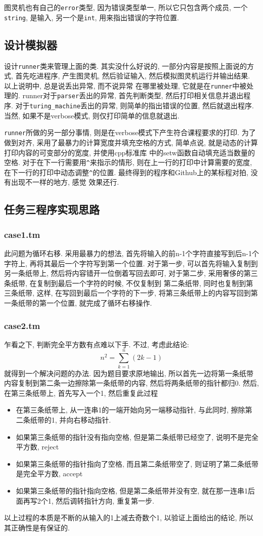 \documentclass[utf8]{article}
\begin{document}
图灵机也有自己的\verb|error|类型, 因为错误类型单一, 所以它只包含两个成员, 一个\verb|string|, 是输入, 另一个是\verb|int|, 用来指出错误的字符位置. 

\subsection[模拟器]{设计模拟器}
设计\verb|runner|类来管理上面的类. 其实没什么好说的,
 一部分内容是按照上面说的方式, 首先吃进程序, 产生图灵机, 然后验证输入, 然后模拟图灵机运行并输出结果. 以上说明中, 总是说丢出异常, 而不说异常
在哪里被处理, 它就是在\verb|runner|中被处理的. runner对于\verb|parser|丢出的异常, 首先判断类型, 然后打印相关信息并退出程序. 对于\verb|turing_machine|丢出的异常, 则简单的指出错误的位置, 
然后就退出程序. 当然, 如果不是verbose模式, 则仅打印简单的信息就退出. 

\verb|runner|所做的另一部分事情, 则是在verbose模式下产生符合课程要求的打印. 为了做到对齐, 采用了最暴力的计算宽度并填充空格的方式, 简单点说, 就是动态的计算打印内容的可变部分的宽度, 并使用cpp标准库
中的setw函数自动填充适当数量的空格. 对于在下一行需要用\verb|^|来指示的情形, 则在上一行的打印中计算需要的宽度, 在下一行的打印中动态调整\verb|^|的位置. 最终得到的程序和Github上的某标程对拍, 没有出现不一样的地方, 感觉
效果还行. 

\subsection[任务三]{任务三程序实现思路}
\subsubsection[一]{case1.tm}
此问题为循环右移. 采用最暴力的想法, 首先将输入的前n-1个字符直接写到后n-1个字符上, 再将其最后一个字符写到第一个位置. 
对于第一步, 可以首先将输入复制到另一条纸带上, 然后将内容错开一位倒着写回去即可, 对于第二步, 采用奢侈的第三条纸带, 在复制到最后一个字符的时候, 不仅复制到
第二条纸带, 同时也复制到第三条纸带, 这样, 在写回到最后一个字符的下一步, 将第三条纸带上的内容写回到第一条纸带的第一个位置, 就完成了循环右移操作. 
\subsubsection[二]{case2.tm}
乍看之下, 判断完全平方数有点难以下手. 不过, 考虑此结论:
\[
n^2 = \sum_{k=1}^{n} (2k-1)
\]
就得到一个解决问题的办法. 
因为题目要求原地输出, 所以首先一边将第一条纸带内容复制到第二条一边擦除第一条纸带的内容, 然后将两条纸带的指针都归0. 然后, 在第三条纸带上, 首先写入一个1, 然后重复此过程
\begin{itemize}
  \item 在第三条纸带上, 从一连串1的一端开始向另一端移动指针, 与此同时, 擦除第二条纸带的1, 并向右移动指针.
  \item 如果第三条纸带的指针没有指向空格, 但是第二条纸带已经空了, 说明不是完全平方数, reject
  \item 如果第三条纸带的指针指向了空格, 而且第二条纸带空了, 则证明了第二条纸带是完全平方数, accept
  \item 如果第三条纸带的指针指向空格, 但是第二条纸带并没有空, 就在那一连串1后面再写2个1, 然后调转指针方向, 重复第一步. 
\end{itemize}
以上过程的本质是不断的从输入的1上减去奇数个1, 以验证上面给出的结论, 所以其正确性是有保证的. 
\end{document}
